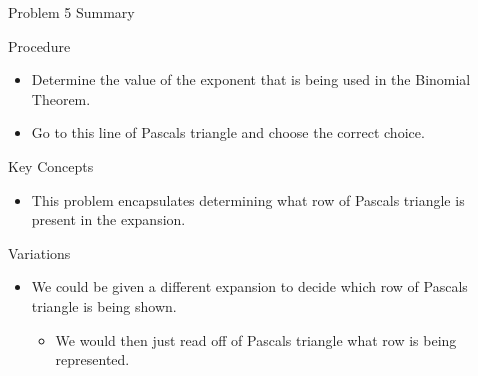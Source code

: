 \begin{summary}{Problem 5 Summary}
    \begin{statement}{Procedure}
        \begin{itemize}
            \item Determine the value of the exponent that is being used in the Binomial Theorem.
            \item Go to this line of Pascals triangle and choose the correct choice.
        \end{itemize}
    \end{statement}
    \begin{statement}{Key Concepts}
        \begin{itemize}
            \item This problem encapsulates determining what row of Pascals triangle is present in the expansion.
        \end{itemize}
    \end{statement}
    \begin{statement}{Variations}
        \begin{itemize}
            \item We could be given a different expansion to decide which row of Pascals triangle is being shown.
            \begin{itemize}
                \item We would then just read off of Pascals triangle what row is being represented.
            \end{itemize}
        \end{itemize}
    \end{statement}
\end{summary}

